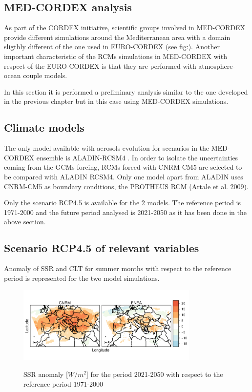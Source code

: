 \begin{subappendices}

\section{MED-CORDEX analysis}

As part of the CORDEX initiative, scientific groups involved in MED-CORDEX provide different simulations around the Mediterranean area with a domain sligthly different of the one used in EURO-CORDEX (see fig:). Another important characteristic of the RCMs simulations in MED-CORDEX with respect of the EURO-CORDEX is that they are performed with atmosphere-ocean couple models.

In this section it is performed a preliminary analysis similar to the one developed in the previous chapter but in this case using MED-CORDEX simulations.

\subsection{Climate models}

The only model available with aerosols evolution for scenarios in the MED-CORDEX ensemble is ALADIN-RCSM4 \cite*{Sevault2014}. In order to isolate the uncertainties coming from the GCMs forcing, RCMs forced with CNRM-CM5 are selected to be compared with ALADIN RCSM4. Only one model apart from ALADIN uses CNRM-CM5 as boundary conditions, the PROTHEUS RCM (Artale et al. 2009).

Only the scenario RCP4.5 is available for the 2 models. The reference period is 1971-2000 and the future period analysed is 2021-2050 as it has been done in the above section.


\subsection{Scenario RCP4.5 of relevant variables}

Anomaly of SSR and CLT for summer months with respect to the reference period is represented for the two model simulations.

\begin{figure}[h!]
    \includegraphics[width=0.8\textwidth]{figs/capitulo7/diferences_ssr_newperiods_9abr.pdf}
    \label{fig:medcordexssr}
  \caption{SSR anomaly [$W/m^2$] for the period 2021-2050 with respect to the reference period 1971-2000}
\end{figure}


\end{subappendices}
